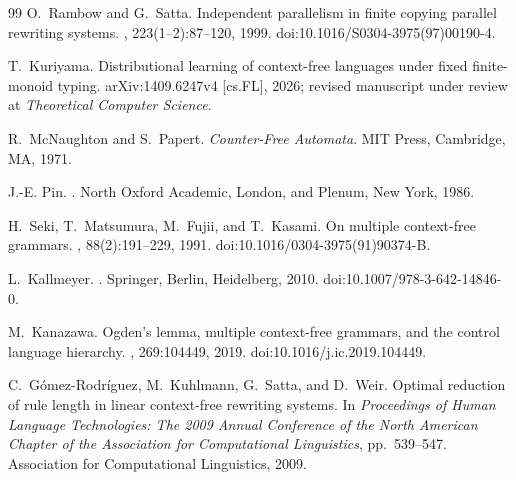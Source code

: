 \documentclass[11pt]{article}
\numberwithin{equation}{section}
\theoremstyle{plain}
\theoremstyle{definition}
\theoremstyle{remark}
\begin{document}
\begin{thebibliography}{99}
O.~Rambow and G.~Satta.
\newblock Independent parallelism in finite copying parallel rewriting systems.
, 223(1--2):87--120, 1999.
\newblock doi:10.1016/S0304-3975(97)00190-4.

T.~Kuriyama.
\newblock Distributional learning of context-free languages under fixed finite-monoid typing.
\newblock arXiv:1409.6247v4 [cs.FL], 2026; revised manuscript under review at
\emph{Theoretical Computer Science}.

R.~McNaughton and S.~Papert.
\newblock \emph{Counter-Free Automata}.
\newblock MIT Press, Cambridge, MA, 1971.

J.-E. Pin.
.
\newblock North Oxford Academic, London, and Plenum, New York, 1986.

H.~Seki, T.~Matsumura, M.~Fujii, and T.~Kasami.
\newblock On multiple context-free grammars.
, 88(2):191--229, 1991.
\newblock doi:10.1016/0304-3975(91)90374-B.

L.~Kallmeyer.
.
\newblock Springer, Berlin, Heidelberg, 2010.
\newblock doi:10.1007/978-3-642-14846-0.

M.~Kanazawa.
\newblock Ogden's lemma, multiple context-free grammars, and the control language hierarchy.
, 269:104449, 2019.
\newblock doi:10.1016/j.ic.2019.104449.

C.~G\'omez-Rodr\'iguez, M.~Kuhlmann, G.~Satta, and D.~Weir.
\newblock Optimal reduction of rule length in linear context-free rewriting systems.
\newblock In {\em Proceedings of Human Language Technologies: The 2009 Annual
Conference of the North American Chapter of the Association for Computational
Linguistics}, pp.~539--547. Association for Computational Linguistics, 2009.


\end{thebibliography}
\normalsize
\end{document}
